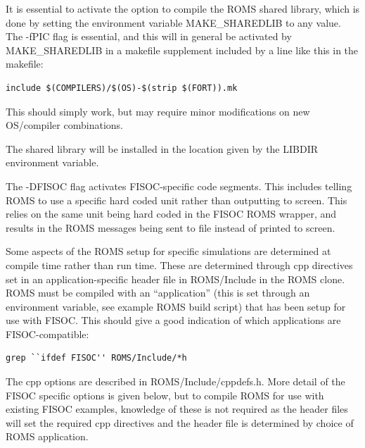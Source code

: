 \documentclass[11pt]{article}
\begin{document}
It is essential to activate the option to compile the ROMS shared library, which 
is done by setting the environment variable MAKE\_SHAREDLIB to any value. 
The -fPIC flag is essential, and this will in general be activated 
by MAKE\_SHAREDLIB in a makefile supplement included by a line like 
this in the makefile:
\begin{lstlisting}
include $(COMPILERS)/$(OS)-$(strip $(FORT)).mk
\end{lstlisting}
This should simply work, but may require minor modifications on new 
OS/compiler combinations.

The shared library will be installed in the location given by the 
 LIBDIR environment variable. 

The -DFISOC flag activates FISOC-specific code segments.  
This includes telling ROMS to use a 
specific hard coded unit rather than outputting to screen.  This relies on the 
same unit being hard coded in the FISOC ROMS wrapper, and results in the ROMS 
messages being sent to file instead of printed to screen.

Some aspects of the ROMS setup for specific simulations are determined at 
compile time rather than run time. 
These are determined through cpp directives set in an application-specific 
header file in ROMS/Include in the ROMS clone. 
ROMS must be compiled with an ``application'' (this is set through an 
environment variable, see example ROMS build script) that has been setup for 
use with FISOC. 
This should give a good indication of which applications are FISOC-compatible:
\begin{lstlisting}
grep ``ifdef FISOC'' ROMS/Include/*h
\end{lstlisting}

The cpp options are described in ROMS/Include/cppdefs.h. 
More detail of the FISOC specific options is given below, but to compile ROMS 
for use with 
existing FISOC examples, knowledge of these is not required as the header 
files will set the required cpp directives and the header file is determined by 
choice of ROMS application.
\end{document}
